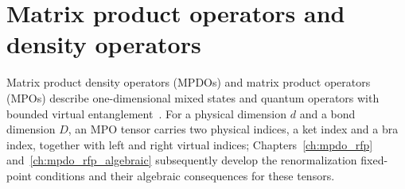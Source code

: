 
\chapter{Matrix product operators and density operators}\label{ch:mpdo}

Matrix product density operators (MPDOs) and matrix product operators (MPOs)
describe one-dimensional mixed states and quantum operators with bounded virtual
entanglement~\cite{Cirac2016MPDO_arXiv,Cirac2017MPDO_AnnPhys,Cirac2021Matrix}.
For a physical dimension $d$ and a bond dimension $D$, an MPO tensor carries two
physical indices, a ket index and a bra index, together with left and right
virtual indices; Chapters~\ref{ch:mpdo_rfp} and~\ref{ch:mpdo_rfp_algebraic}
subsequently develop the renormalization fixed-point conditions and their
algebraic consequences for these tensors.




